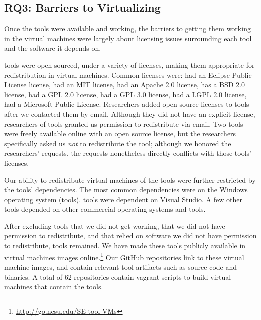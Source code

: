 \documentclass[10pt,conference]{IEEEtran}
\begin{document}
\subsection{RQ3: Barriers to Virtualizing}

Once the tools were available and working, 
the barriers to getting them working in the
virtual machines were largely about licensing issues
surrounding each tool and the software it depends on.

\redistPermissionArtifact tools were open-sourced, 
under a variety of licenses, making them appropriate
for redistribution in virtual machines.
Common licenses were:
\licenseEPL had an Eclipse Public License license,
\licenseMIT had an MIT license,
\licenseApache had an Apache 2.0 license,
\licenseBSD has a BSD 2.0 license,
\licenseGPL had a GPL 2.0 license,
\licenseGPLThree had a GPL 3.0 license,
\licenseLGPL had a LGPL 2.0 license,
\licenseMPL had a Microsoft Public License.
Researchers added open source licenses to \contactOSSed tools
after we contacted them by email.	
Although they did not have an explicit license,
researchers of \redistPermissionEmail tools granted us
permission to redistribute via email.
Two tools were freely available online
with an open source license, but the researchers
specifically asked us \emph{not} to redistribute the
tool; although we honored the researchers' requests,
the requests nonetheless directly conflicts
with those tools' licenses.  

Our ability to redistribute virtual machines of the tools were
further restricted by the tools' dependencies.
The most common dependencies were on the Windows 
operating system (\depWindows tools).
\depVS tools were dependent on Visual Studio.
A few other tools depended on other commercial 
operating systems and tools.
 
After excluding tools 
that we did not get working,
that we did not have permission to redistribute, and 
that relied on software we did not have permission to redistribute,
\permissionToRedistribute tools remained.
We have made these tools publicly available in virtual machines 
images online.\footnote{\url{http://go.ncsu.edu/SE-tool-VMs}}
Our GitHub repositories link to these virtual machine images,
and contain relevant tool artifacts such as source code
and binaries.
A total of 62 repositories 
contain vagrant scripts to build 
virtual machines that contain the tools. 
\end{document}
